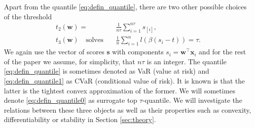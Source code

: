 Apart from the quantile \eqref{eq:defin_quantile}, there are two other possible choices of the threshold
\begin{align}
  \label{eq:defin_quantile1} t_2(\bm{w}) =\ &\frac{1}{n\tau}\sum_{i=1}^{n\tau} s_{[i]}, \\
  \label{eq:defin_quantile0} t_3(\bm{w})\quad \text{solves} \quad & \frac{1}{n}\sum_{i = 1}^nl(\beta(s_i - t)) = \tau.
\end{align}
We again use the vector of scores $\bm{s}$ with components $s_i = \bm{w}^\top \bm{x}_i$ and for the rest of the paper we assume, for simplicity, that $n\tau$ is an integer. The quantile \eqref{eq:defin_quantile} is sometimes denoted as VaR (value at risk) and \eqref{eq:defin_quantile1} as CVaR (conditional value of risk). It is known is that the latter is the tightest convex approximation of the former. We will sometimes denote \eqref{eq:defin_quantile0} as surrogate top $\tau$-quantile. We will investigate the relations between these three objects as well as their properties such as convexity, differentiability or stability in Section \ref{sec:theory}.

